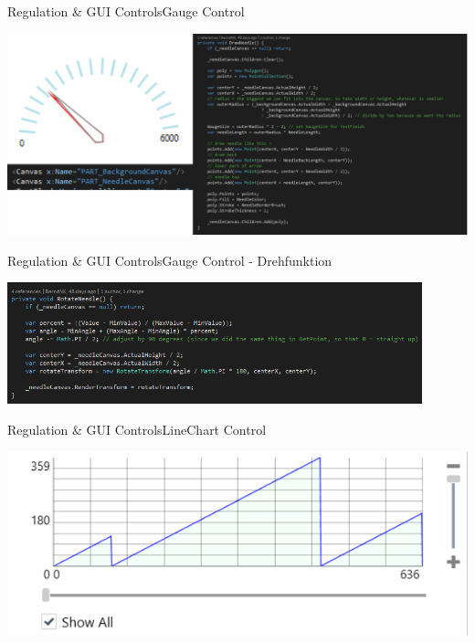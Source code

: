 	\begin{frame}{Regulation \& GUI Controls}{Gauge Control}
		\begin{center}		
			\includegraphics[width=1.05\textwidth]{../regulation/GaugeControlComplete.png}	
		\end{center}
	\end{frame}

\begin{frame}{Regulation \& GUI Controls}{Gauge Control - Drehfunktion}
	\begin{center}		
		\includegraphics[width=0.9\textwidth]{../regulation/RotateNeedle.png}	
	\end{center}
\end{frame}

	\begin{frame}{Regulation \& GUI Controls}{LineChart Control}
		\begin{center}			
			\includegraphics[width=1.05\textwidth]{../regulation/LineChart.png}
		\end{center}
	\end{frame}

